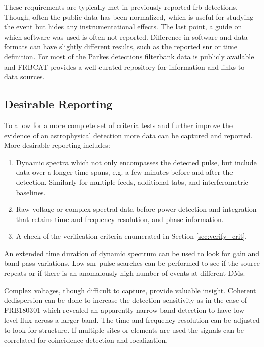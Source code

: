 \documentclass[a4paper,fleqn,usenatbib]{mnras}
\begin{document}

These requirements are typically met in previously reported \gls{frb}
detections. Though, often the public data has been normalized, which is useful
for studying the event but hides any instrumentational effects.  The last point,
a guide on which software was used is often not reported.  Difference in
software and data formats can have slightly different results, such as the
reported \gls{snr} or time definition. For most of the Parkes detections
filterbank data is publicly available and FRBCAT \citep{2016PASA...33...45P}
provides a well-curated repository for information and links to data sources.

\subsection{Desirable Reporting}

To allow for a more complete set of criteria tests and further improve the
evidence of an astrophysical detection more data can be captured and reported.
More desirable reporting includes:

\begin{enumerate}
    \item Dynamic spectra which not only encompasses the detected pulse, but
    include data over a longer time spans, e.g. a few minutes before and after
    the detection. Similarly for multiple feeds, additional \glspl{tab}, and
    interferometric baselines.
    \item Raw voltage or complex spectral data before power detection and
    integration that retains time and frequency resolution, and phase
    information.
    \item A check of the verification criteria enumerated in Section
    \ref{sec:verify_crit}.
\end{enumerate}

An extended time duration of dynamic spectrum can be used to look for gain and
band pass variations. Low-\gls{snr} pulse searches can be performed to see if
the source repeats or if there is an anomalously high number of events at
different DMs.

Complex voltages, though difficult to capture, provide valuable insight.
Coherent dedispersion can be done to increase the detection sensitivity as in
the case of FRB180301 \citep{atel11376} which revealed an apparently narrow-band
detection to have low-level flux across a larger band. The time and frequency
resolution can be adjusted to look for structure. If multiple sites or elements
are used the signals can be correlated for coincidence detection and
localization.
\end{document}
